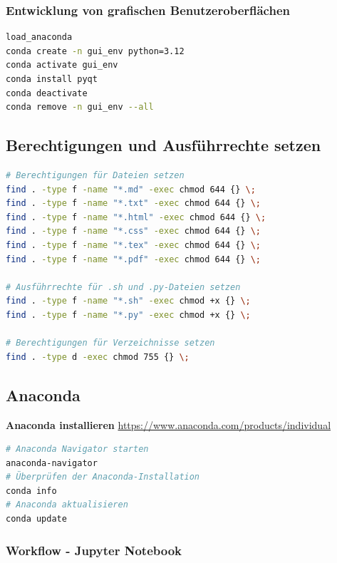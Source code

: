 \documentclass{vorlage-design-main}
\begin{document}
\subsubsection{Entwicklung von grafischen
Benutzeroberflächen}\label{entwicklung-von-grafischen-benutzeroberflaechen}

\begin{lstlisting}[language=bash]
load_anaconda
conda create -n gui_env python=3.12
conda activate gui_env
conda install pyqt
conda deactivate
conda remove -n gui_env --all
\end{lstlisting}

\subsection{Berechtigungen und Ausführrechte
setzen}\label{berechtigungen-und-ausfuehrrechte-setzen}

\begin{lstlisting}[language=bash]
# Berechtigungen für Dateien setzen
find . -type f -name "*.md" -exec chmod 644 {} \;
find . -type f -name "*.txt" -exec chmod 644 {} \;
find . -type f -name "*.html" -exec chmod 644 {} \;
find . -type f -name "*.css" -exec chmod 644 {} \;
find . -type f -name "*.tex" -exec chmod 644 {} \;
find . -type f -name "*.pdf" -exec chmod 644 {} \;

# Ausführrechte für .sh und .py-Dateien setzen
find . -type f -name "*.sh" -exec chmod +x {} \;
find . -type f -name "*.py" -exec chmod +x {} \;

# Berechtigungen für Verzeichnisse setzen
find . -type d -exec chmod 755 {} \;
\end{lstlisting}

\subsection{Anaconda}\label{anaconda}

\textbf{Anaconda installieren}
\url{https://www.anaconda.com/products/individual}

\begin{lstlisting}[language=bash]
# Anaconda Navigator starten
anaconda-navigator
# Überprüfen der Anaconda-Installation
conda info
# Anaconda aktualisieren
conda update
\end{lstlisting}

\subsubsection{Workflow - Jupyter
Notebook}\label{workflow---jupyter-notebook}
\end{document}
